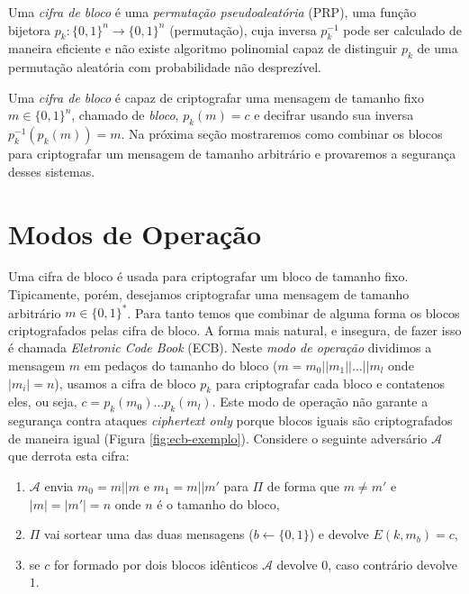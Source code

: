 Uma {\em cifra de bloco} é uma {\em permutação pseudoaleatória} (PRP), uma função bijetora $p_k: \{0,1\}^n \to \{0,1\}^n$ (permutação), cuja inversa $p_k^{-1}$ pode ser calculado de maneira eficiente e não existe algoritmo polinomial capaz de distinguir $p_k$ de uma permutação aleatória com probabilidade não desprezível.

Uma {\em cifra de bloco} é capaz de criptografar uma mensagem de tamanho fixo $m \in \{0,1\}^n$, chamado de {\em bloco}, $p_k(m) = c$ e decifrar usando sua inversa $p_k^{-1}(p_k(m)) = m$.
Na próxima seção mostraremos como combinar os blocos para criptografar um mensagem de tamanho arbitrário e provaremos a segurança desses sistemas.

\section{Modos de Operação}
\label{sec:modos-de-operacao-bloco}

Uma cifra de bloco é usada para criptografar um bloco de tamanho fixo.
Tipicamente, porém, desejamos criptografar uma mensagem de tamanho arbitrário $m \in \{0,1\}^*$.
Para tanto temos que combinar de alguma forma os blocos criptografados pelas cifra de bloco.
A forma mais natural, e insegura, de fazer isso é chamada {\em Eletronic Code Book} (ECB).
Neste {\em modo de operação} dividimos a mensagem $m$ em pedaços do tamanho do bloco ($m = m_0 || m_1 || \dots || m_l$ onde $|m_i| = n$), usamos a cifra de bloco $p_k$ para criptografar cada bloco e contatenos eles, ou seja, $c = p_k(m_0) \dots p_k(m_l)$.
Este modo de operação não garante a segurança contra ataques {\em ciphertext only} porque blocos iguais são criptografados de maneira igual (Figura \ref{fig:ecb-exemplo}).
Considere o seguinte adversário $\mathcal{A}$ que derrota esta cifra:
\begin{enumerate}
\item $\mathcal{A}$ envia $m_0 = m||m$ e $m_1=m||m'$ para $\Pi$ de forma que $m \neq m'$ e $|m| = |m'| = n$ onde $n$ é o tamanho do bloco,
\item $\Pi$ vai sortear uma das duas mensagens ($b \leftarrow \{0,1\}$) e devolve $E(k, m_b) =c$,
\item se $c$ for formado por dois blocos idênticos $\mathcal{A}$ devolve $0$, caso contrário devolve $1$.
\end{enumerate}

\begin{center}
\end{center}


